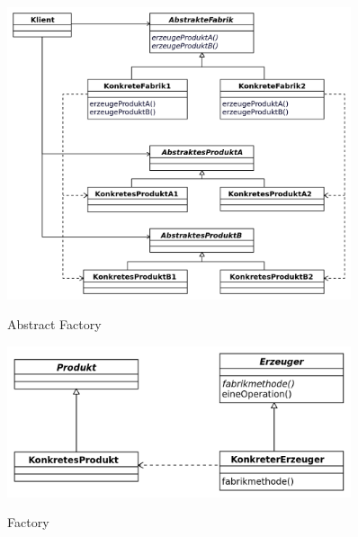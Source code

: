 \begin{figure}[htb]
	\centering
	\begin{minipage}[t]{0.45\linewidth}
		\centering
		\includegraphics[width=0.9\textwidth]{images/abstract_factory}
		\label{fig:abstract_factory}
		\caption{Abstract Factory}
	\end{minipage}%
	\hfill
	\begin{minipage}[t]{0.45\linewidth}
		\centering
		\includegraphics[width=0.9\textwidth]{images/factory}
		\label{fig:factory}
		\caption{Factory}
	\end{minipage}
\end{figure}


